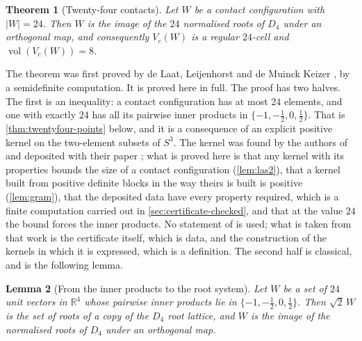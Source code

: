 \documentclass[11pt,reqno]{amsart}
\renewcommand{\_}{\origunderscore\allowbreak}
\numberwithin{equation}{section}
\theoremstyle{plain}
\newtheorem{thm}{Theorem}[section]
\newtheorem{lem}[thm]{Lemma}
\theoremstyle{definition}
\theoremstyle{remark}
\DeclareMathOperator{\vol}{vol}
\begin{document}
\begin{thm}[Twenty-four contacts]\label{thm:m24}
Let $W$ be a contact configuration with $|W|=24$. Then $W$ is the image
of the $24$ normalised roots of $D_4$ under an orthogonal map, and
consequently $V_c(W)$ is a regular $24$-cell and $\vol(V_c(W))=8$.
\end{thm}

The theorem was first proved by de Laat, Leijenhorst and de Muinck Keizer
\cite[Thm.~5.3]{LLM24}, by a semidefinite computation. It is proved here in
full. The proof has two halves. The first is an inequality: a contact
configuration has at most $24$ elements, and one with exactly $24$ has all
its pairwise inner products in $\{-1,-\tfrac12,0,\tfrac12\}$. That is
\cref{thm:twentyfour-points} below, and it is a consequence of an explicit
positive kernel on the two-element subsets of $S^3$. The kernel was found by
the authors of \cite{LLM24} and deposited with their paper
\cite{LLM24data}; what is proved here is that any kernel with its
properties bounds the size of a contact configuration
(\cref{lem:las2}), that a kernel built from positive definite blocks in the
way theirs is built is positive (\cref{lem:gram}), that the deposited data
have every property required, which is a finite computation carried out in
\cref{sec:certificate-checked}, and that at the value $24$ the bound
forces the inner products. No statement of \cite{LLM24} is used; what is
taken from that work is the certificate itself, which is data, and the
construction of the kernels in which it is expressed, which is a
definition. The second half is classical, and is the following lemma.

\begin{lem}[From the inner products to the root system]\label{lem:root-lattice}
Let $W$ be a set of $24$ unit vectors in $\mathbb{R}^4$ whose pairwise
inner products lie in $\{-1,-\tfrac12,0,\tfrac12\}$. Then $\sqrt2\,W$ is
the set of roots of a copy of the $D_4$ root lattice, and $W$ is the
image of the normalised roots of $D_4$ under an orthogonal map.
\end{lem}
\end{document}
